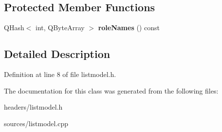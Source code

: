 \subsection*{Protected Member Functions}
\begin{DoxyCompactItemize}
\item 
\mbox{\label{class_list_model_ac58278766ba826b23cc5949fbef16362}} 
Q\+Hash$<$ int, Q\+Byte\+Array $>$ {\bfseries role\+Names} () const
\end{DoxyCompactItemize}


\subsection{Detailed Description}


Definition at line 8 of file listmodel.\+h.



The documentation for this class was generated from the following files\+:\begin{DoxyCompactItemize}
\item 
headers/listmodel.\+h\item 
sources/listmodel.\+cpp\end{DoxyCompactItemize}
